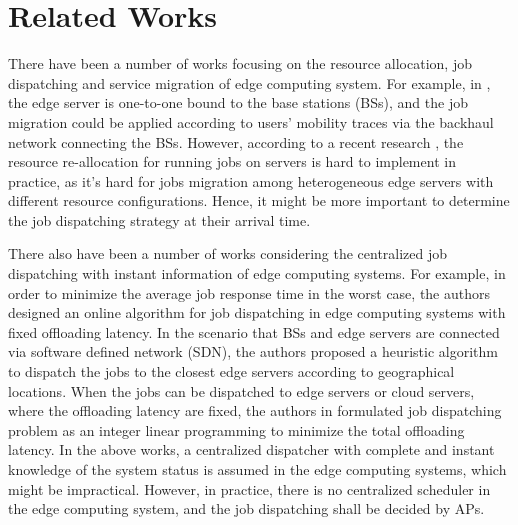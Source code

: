 \section{Related Works}
\label{sec:review}
There have been a number of works focusing on the resource allocation, job dispatching and service migration of edge computing system.
For example, in \cite{TON19-WangSq}, the edge server is one-to-one bound to the base stations (BSs), and the job migration could be applied according to users' mobility traces via the backhaul network connecting the BSs.
However, according to a recent research \cite{INFOCOM19-WuC}, the resource re-allocation for running jobs on servers is hard to implement in practice, as it's hard for jobs migration among heterogeneous edge servers with different resource configurations.
Hence, it might be more important to determine the job dispatching strategy at their arrival time.


There also have been a number of works considering the centralized job dispatching with instant information of edge computing systems. For example, in order to minimize the average job response time in the worst case, the authors \cite{tan-online} designed an online algorithm for job dispatching in edge computing systems with fixed offloading latency. In the scenario that BSs and edge servers are connected via software defined network (SDN), the authors \cite{IOTJ18-FanQ} proposed a heuristic algorithm to dispatch the jobs to the closest edge servers according to geographical locations. When the jobs can be dispatched to edge servers or cloud servers, where the offloading latency are fixed, 
the authors in \cite{MASS18-MengZ} formulated job dispatching problem as an integer linear programming to minimize the total offloading latency.
In the above works, a centralized dispatcher with complete and instant knowledge of the system status is assumed in the edge computing systems, which might be impractical.
However, in practice, there is no centralized scheduler in the edge computing system, and the job dispatching shall be decided by APs. 

